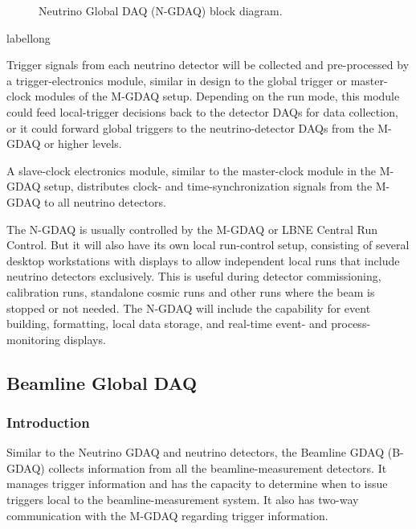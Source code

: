 \begin{figure}[htp]
\begin{center}
\caption{\label{fig:GDAQ_N_Block} Neutrino Global DAQ (N-GDAQ) block 
diagram.  %
}
\end{center}
\end{figure}
\begin{cdrfigure}[short]{label}{long}
\end{cdrfigure}

Trigger signals from each neutrino detector will be collected and 
pre-processed by a trigger-electronics module, similar in design to the 
global trigger or master-clock modules %
of the M-GDAQ setup. Depending on the run mode, this module could feed 
local-trigger decisions back to the detector DAQs for data collection, or 
it could
forward global triggers to the neutrino-detector DAQs from the M-GDAQ or 
higher levels.

A slave-clock electronics module, similar to the master-clock module in 
the M-GDAQ setup, distributes clock- and time-synchronization signals 
from the M-GDAQ to all neutrino detectors.

The N-GDAQ is usually controlled by the %
M-GDAQ  %
or LBNE Central Run 
Control.  But it will also have its own local run-control setup, 
consisting of several desktop workstations with displays to allow 
independent local runs 
that include %
neutrino  detectors exclusively. This is useful during detector commissioning, calibration 
runs, standalone cosmic runs and other runs where the beam is stopped or 
not needed. %
The N-GDAQ will include the capability for event building, 
formatting, local data storage, and real-time event- and process-monitoring displays.


\subsection{Beamline Global DAQ}
\label{subsec:B-GDAQ}

\subsubsection{Introduction} %
Similar to the Neutrino GDAQ and neutrino detectors, the Beamline GDAQ (B-GDAQ) collects 
information from all %
the beamline-measurement detectors.
 It manages trigger information and has the capacity 
to determine when to issue triggers local to the beamline-measurement system. It 
also has two-way communication with the %
M-GDAQ %
regarding trigger 
information.

